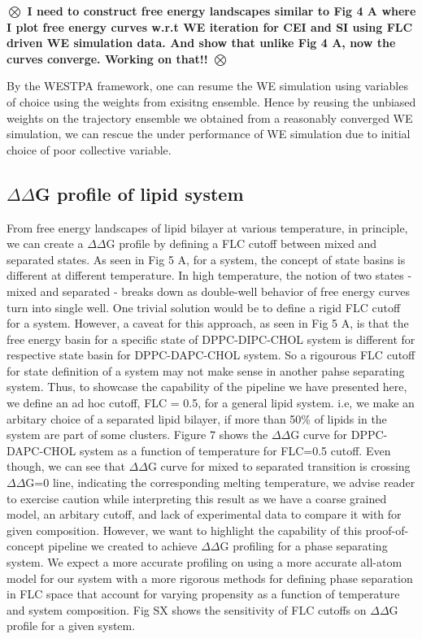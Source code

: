 \documentclass{biophys-new}
\begin{document}
\textbf{$\bigotimes$ I need to construct free energy landscapes similar to Fig 4 A where I plot free energy curves w.r.t WE iteration for CEI and SI using FLC driven WE simulation data. And show that unlike Fig 4 A, now the curves converge. Working on that!! $\bigotimes$}

By the WESTPA framework, one can resume the WE simulation using variables of choice using the weights from exisitng ensemble\cite{Zhang2010,Zwier2015}.
Hence by reusing the unbiased weights on the trajectory ensemble we obtained from a reasonably converged WE simulation,
we can rescue the under performance of WE simulation due to initial choice of poor collective variable.

\subsection*{$\Delta\Delta$G profile of lipid system}

From free energy landscapes of lipid bilayer at various temperature, in principle, we can create a $\Delta\Delta$G profile by defining a FLC cutoff between mixed and separated states.
As seen in Fig 5 A, for a system, the concept of state basins is different at different temperature.
In high temperature, the notion of two states - mixed and separated - breaks down as double-well behavior of free energy curves turn into single well. 
One trivial solution would be to define a rigid FLC cutoff for a system.
However, a caveat for this approach, as seen in Fig 5 A, is that the free energy basin for a specific state of DPPC-DIPC-CHOL system is different for respective state basin for DPPC-DAPC-CHOL system.
So a rigourous FLC cutoff for state definition of a system may not make sense in another pahse separating system.
Thus, to showcase the capability of the pipeline we have presented here, we define an ad hoc cutoff, FLC = 0.5, for a general lipid system.   
i.e, we make an arbitary choice of a separated lipid bilayer, if more than 50\% of lipids in the system are part of some clusters.
Figure 7 shows the $\Delta\Delta$G curve for DPPC-DAPC-CHOL system as a function of temperature for FLC=0.5 cutoff.
Even though, we can see that $\Delta\Delta$G curve for mixed to separated transition is crossing $\Delta\Delta$G=0 line, indicating the corresponding melting temperature,
we advise reader to exercise caution while interpreting this result as we have a coarse grained model, an arbitary cutoff, and lack of experimental data to compare it with for given composition.
However, we want to highlight the capability of this proof-of-concept pipeline we created to achieve $\Delta\Delta$G profiling for a phase separating system.
We expect a more accurate profiling on using a more accurate all-atom model for our system with a more rigorous methods for defining phase separation in FLC space that account for 
varying propensity as a function of temperature and system composition.
Fig SX shows the sensitivity of FLC cutoffs on $\Delta\Delta$G profile for a given system.
\end{document}
